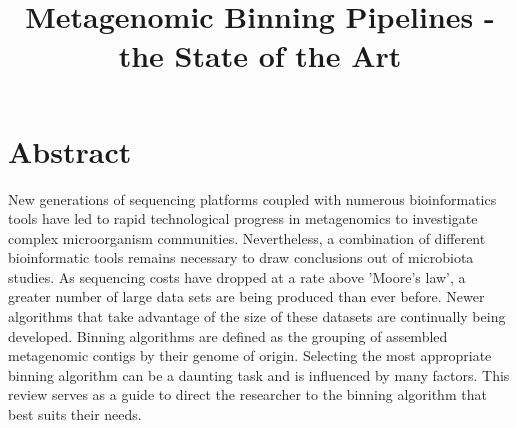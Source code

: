 \documentclass{article}
\title{Metagenomic Binning Pipelines - the State of the Art}
\date{}
\begin{document}
\maketitle

\tableofcontents

\section{Abstract}
New generations of sequencing platforms coupled with numerous bioinformatics tools have led to rapid technological progress in metagenomics to investigate complex microorganism communities.
Nevertheless, a combination of different bioinformatic tools remains necessary to draw conclusions out of microbiota studies.
As sequencing costs have dropped at a rate above 'Moore's law', a greater number of large data sets are being produced than ever before.
Newer algorithms that take advantage of the size of these datasets are continually being developed.
Binning algorithms are defined as the grouping of assembled metagenomic contigs by their genome of origin.
Selecting the most appropriate binning algorithm can be a daunting task and is influenced by many factors.
This review serves as a guide to direct the researcher to the binning algorithm that best suits their needs.
\end{document}
